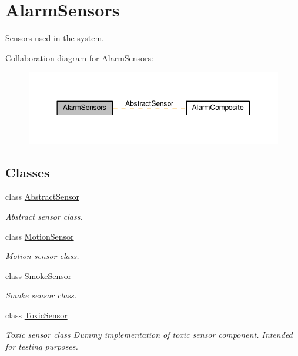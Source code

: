 \hypertarget{group__AlarmSensors}{}\section{Alarm\+Sensors}
\label{group__AlarmSensors}


Sensors used in the system.  


Collaboration diagram for Alarm\+Sensors\+:\nopagebreak
\begin{figure}[H]
\begin{center}
\leavevmode
\includegraphics[width=350pt]{group__AlarmSensors}
\end{center}
\end{figure}
\subsection*{Classes}
\begin{DoxyCompactItemize}
\item 
class \hyperlink{classAbstractSensor}{Abstract\+Sensor}
\begin{DoxyCompactList}\small\item\em Abstract sensor class. \end{DoxyCompactList}\item 
class \hyperlink{classMotionSensor}{Motion\+Sensor}
\begin{DoxyCompactList}\small\item\em Motion sensor class. \end{DoxyCompactList}\item 
class \hyperlink{classSmokeSensor}{Smoke\+Sensor}
\begin{DoxyCompactList}\small\item\em Smoke sensor class. \end{DoxyCompactList}\item 
class \hyperlink{classToxicSensor}{Toxic\+Sensor}
\begin{DoxyCompactList}\small\item\em Toxic sensor class Dummy implementation of toxic sensor component. Intended for testing purposes. \end{DoxyCompactList}\end{DoxyCompactItemize}


